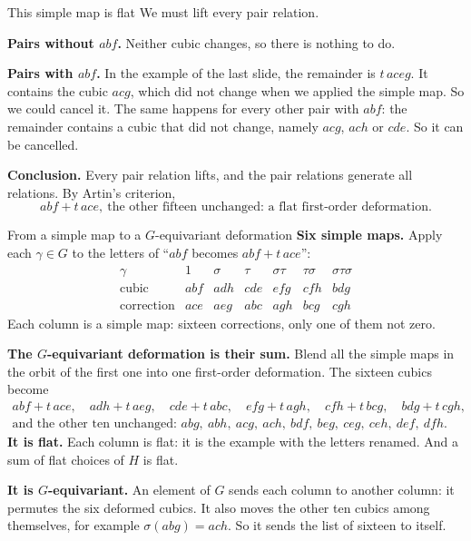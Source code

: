 \begin{frame}{This simple map is flat}
We must lift every pair relation.
\par\bigskip
\textbf{Pairs without \(abf\).} Neither cubic changes, so there is nothing to do.
\par\bigskip
\textbf{Pairs with \(abf\).} In the example of the last slide, the remainder is \(t\,aceg\). It contains the cubic \(acg\), which did not change when we applied the simple map. So we could cancel it. The same happens for every other pair with \(abf\): the remainder contains a cubic that did not change, namely \(acg\), \(ach\) or \(cde\). So it can be cancelled.
\par\bigskip
\textbf{Conclusion.} Every pair relation lifts, and the pair relations generate all relations. By Artin's criterion,
\[
\boxed{abf+t\,ace,\ \text{the other fifteen unchanged: a flat first-order deformation.}}
\]
\end{frame}

\begin{frame}{From a simple map to a \(G\)-equivariant deformation}
\textbf{Six simple maps.} Apply each \(\gamma\in G\) to the letters of ``\(abf\) becomes \(abf+t\,ace\)'':
\[
\begin{array}{c|cccccc}
\gamma&1&\sigma&\tau&\sigma\tau&\tau\sigma&\sigma\tau\sigma\\\hline
\text{cubic}&abf&adh&cde&efg&cfh&bdg\\
\text{correction}&ace&aeg&abc&agh&bcg&cgh
\end{array}
\]
Each column is a simple map: sixteen corrections, only one of them not zero.
\par
\textbf{The \(G\)-equivariant deformation is their sum.} Blend all the simple maps in the orbit of the first one into one first-order deformation. The sixteen cubics become
\[
\boxed{\begin{array}{c}
abf+t\,ace,\quad adh+t\,aeg,\quad cde+t\,abc,\quad efg+t\,agh,\quad cfh+t\,bcg,\quad bdg+t\,cgh,\\[3pt]
\text{and the other ten unchanged: }abg,\ abh,\ acg,\ ach,\ bdf,\ beg,\ ceg,\ ceh,\ def,\ dfh.
\end{array}}
\]
\textbf{It is flat.} Each column is flat: it is the example with the letters renamed. And a sum of flat choices of \(H\) is flat.
\par
\textbf{It is \(G\)-equivariant.} An element of \(G\) sends each column to another column: it permutes the six deformed cubics. It also moves the other ten cubics among themselves, for example \(\sigma(abg)=ach\). So it sends the list of sixteen to itself.
\end{frame}

